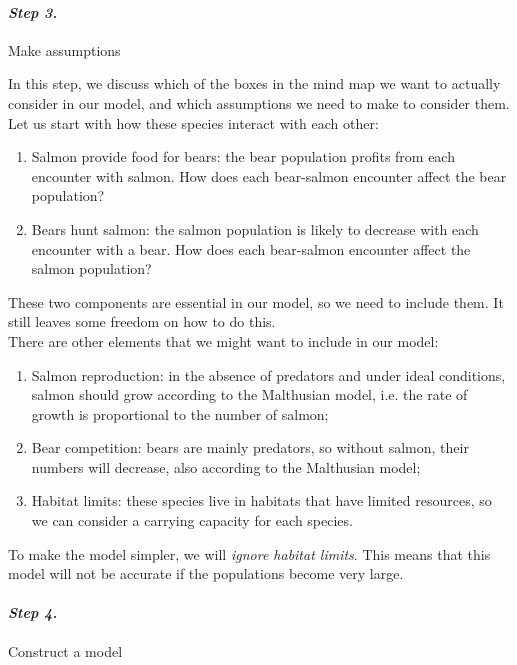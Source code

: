 \paragraph{\emph{Step 3.}} Make assumptions

\begin{example}
In this step, we discuss which of the boxes in the mind map we want to actually consider in our model, and which assumptions we need to make to consider them. \\

Let us start with how these species interact with each other:
\begin{enumerate}
	\item Salmon provide food for bears: the bear population profits from each encounter with salmon. How does each bear-salmon encounter affect the bear population?
	\item Bears hunt salmon: the salmon population is likely to decrease with each encounter with a bear. How does each bear-salmon encounter affect the salmon population?
\end{enumerate}

These two components are essential in our model, so we need to include them. It still leaves some freedom on how to do this. \\

There are other elements that we might want to include in our model:
\begin{enumerate}[start=3]
	\item Salmon reproduction: in the absence of predators and under ideal conditions, salmon should grow according to the Malthusian model, i.e. the rate of growth is proportional to the number of salmon;
	\item Bear competition: bears are mainly predators, so without salmon, their numbers will decrease, also according to the Malthusian model;
	\item Habitat limits: these species live in habitats that have limited resources, so we can consider a carrying capacity for each species.
\end{enumerate}

To make the model simpler, we will \emph{ignore habitat limits}. This means that this model will not be accurate if the populations become very large.
	
\end{example}


\paragraph{\emph{Step 4.}} Construct a model

